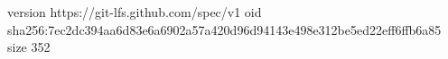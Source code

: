 version https://git-lfs.github.com/spec/v1
oid sha256:7ec2dc394aa6d83e6a6902a57a420d96d94143e498e312be5ed22eff6ffb6a85
size 352
